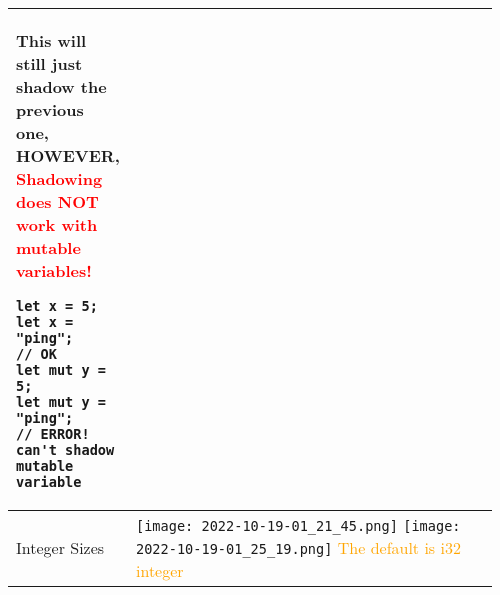 \documentclass[main.tex,fontsize=8pt,paper=a4,paper=portrait,DIV=calc,]{scrartcl}
\begin{document}
\begin{table}[ht!]
\begin{tabular}{|m{0.2\linewidth}|m{0.755\linewidth}|}
{This will still just shadow the previous one, \textbf{HOWEVER}, }\textcolor{red}{Shadowing does \textbf{NOT work with mutable variables!}}\newline
\begin{lstlisting}
let x = 5;
let x = "ping";
// OK
let mut y = 5;
let mut y = "ping";
// ERROR! can't shadow mutable variable
\end{lstlisting}\\
\hline 
Integer Sizes& 
\vspace{2mm}
\texttt{[image: 2022-10-19-01\_21\_45.png]}
\texttt{[image: 2022-10-19-01\_25\_19.png]}\newline
\textcolor{orange}{The default is i32 integer}
\\
\hline
\end{tabular}
\end{table}
\pagebreak
\end{document}
